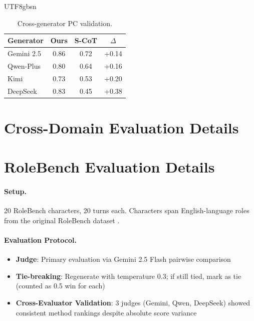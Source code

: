 \documentclass[11pt]{article}
\begin{document}
\begin{CJK*}{UTF8}{gbsn}
\begin{table}[h]
\centering
\small
\begin{tabular}{lccc}
\toprule
\textbf{Generator} & \textbf{Ours} & \textbf{S-CoT} & \textbf{$\Delta$} \\
\midrule
Gemini 2.5 & 0.86 & 0.72 & +0.14 \\
Qwen-Plus & 0.80 & 0.64 & +0.16 \\
Kimi & 0.73 & 0.53 & +0.20 \\
DeepSeek & 0.83 & 0.45 & +0.38 \\
\bottomrule
\end{tabular}
\caption{Cross-generator PC validation.}
\label{tab:opensource_gen}
\end{table}

\section{Cross-Domain Evaluation Details}
\label{sec:crossdomain_details}

\begin{table}[h]
\centering
\scriptsize
{}
\caption{Cross-domain PC comparison.}
\label{tab:crossdomain}
\end{table}

\section{RoleBench Evaluation Details}
\label{sec:rolebench_details}

\paragraph{Setup.} 20 RoleBench characters, 20 turns each. Characters span English-language roles from the original RoleBench dataset \citep{wang2024rolellm}.

\paragraph{Evaluation Protocol.}
\begin{itemize}
    \item \textbf{Judge}: Primary evaluation via Gemini 2.5 Flash pairwise comparison
    \item \textbf{Tie-breaking}: Regenerate with temperature 0.3; if still tied, mark as tie (counted as 0.5 win for each)
    \item \textbf{Cross-Evaluator Validation}: 3 judges (Gemini, Qwen, DeepSeek) showed consistent method rankings despite absolute score variance
\end{itemize}


\end{CJK*}
\end{document}
